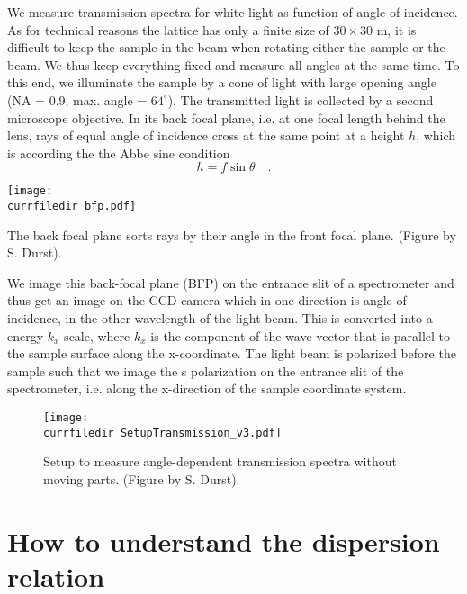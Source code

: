 We measure transmission spectra for white light as function of angle of incidence. As for technical reasons the lattice has only a finite size of $30 \times 30$ \textmu m, it is difficult to keep the sample in the beam when rotating either the sample or the beam. We thus keep everything fixed and measure all angles at the same time. To this end, we illuminate the sample by a cone of light with large opening angle (NA = 0.9, max. angle = $64^\circ$). The transmitted light is collected by a second microscope objective. In its back focal plane, i.e. at one focal length behind the lens, rays of equal angle of incidence cross at the same point at a height $h$, which is according the the Abbe sine condition
\begin{equation}
 h = f \sin \theta \quad .
\end{equation}

\begin{marginfigure}
\texttt{[image: \\currfiledir bfp.pdf]}
\caption{The back focal plane sorts rays by their angle in the front focal plane.  (Figure by S. Durst).}
\end{marginfigure}

We image this back-focal plane (BFP) on the entrance slit of a spectrometer and thus get an image on the CCD camera which in one direction is angle of incidence, in the other wavelength of the light beam. This is converted into a energy-$k_x$ scale, where $k_x$ is the component of the wave vector that is parallel to the sample surface along the x-coordinate. The light beam is polarized before the sample such that we image the s polarization on the entrance slit of the spectrometer, i.e. along the x-direction of the sample coordinate system.


\begin{figure}
\texttt{[image: \\currfiledir SetupTransmission\_v3.pdf]}
\caption{Setup to measure angle-dependent transmission spectra without moving parts.  (Figure by S. Durst). }
\end{figure}


\section{How to understand the dispersion relation}

